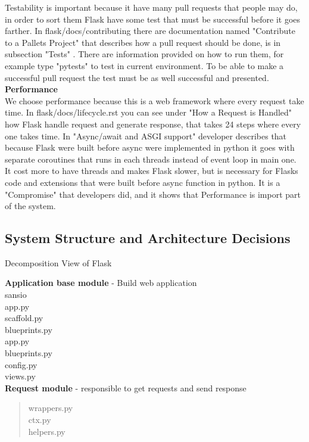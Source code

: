 \documentclass[12pt,a4paper]{article}
\begin{document}
 Testability is important because it have many pull requests that people may do, in order to sort them Flask have some test that must be successful before it goes farther. In flask/docs/contributing there are documentation named  "Contribute to a Pallets Project" that describes how a pull request should be done, is in subsection "Tests" \cite{pullr}. There are information provided on how to run them, for example type "pytests" to test in current environment. To be able to make a successful pull request the test must be as well successful and presented. \\
 \textbf{Performance}\\
 We choose performance because this is a web framework where every request take time. In flask/docs/lifecycle.rst \cite{flaskgit} you can see under "How a Request is Handled" how Flask handle request and generate response, that takes 24 steps where every one takes time.  In \cite{flaskdocs} "Async/await and ASGI support" developer describes that because Flask were built before async were implemented in python it goes with separate coroutines that runs in each threads instead of event loop in main one. It cost more to have threads and makes Flask slower, but is necessary for Flasks code and extensions that were built before async function in python.\cite{flaskdocs} It is a "Compromise" that developers did, and it shows that Performance is import part of the system. 


 \subsection{System Structure and Architecture Decisions}
\label{sec:system_structure}
Decomposition View of Flask


 \textbf{Application base module} - Build web application \\
 \indent sansio\\
 \indent \indent app.py\\
 \indent \indent scaffold.py\\
 \indent \indent blueprints.py\\
 \indent app.py\\
 \indent blueprints.py\\
 \indent config.py\\
 \indent views.py\\

 \textbf{Request module} - responsible to get requests and send response  \\
 \begin{quote}
 wrappers.py\\
 ctx.py\\
 helpers.py
\end{quote} 
\end{document}
